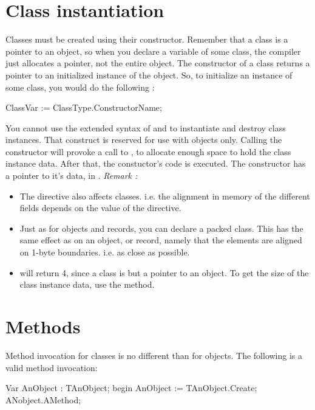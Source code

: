 \documentclass{report}
\begin{document}
\section{Class instantiation}
Classes must be created using their constructor. Remember that a class is a
pointer to an object, so when you declare a variable of some class, the
compiler just allocates a pointer, not the entire object. The constructor of
a class returns a pointer to an initialized instance of the object.
So, to initialize an instance of some class, you would do the following :
\begin{listing}
  ClassVar := ClassType.ConstructorName;
\end{listing}
You cannot use the extended syntax of  and  to
instantiate and destroy class instances. 
That construct is reserved for use with objects only.
Calling the constructor will provoke a call to , to allocate
enough space to hold the class instance data. 
After that, the constuctor's code is executed. 
The constructor has a pointer to it's data, in .
{\em Remark :}
\begin{itemize}
\item The  directive also affects classes.
i.e. the alignment in memory of the different fields depends on the
value of  the  directive.
\item Just as for objects and records, you can declare a packed class.
This has the same effect as on an object, or record, namely that the
elements are aligned on 1-byte boundaries. i.e. as close as possible.
\item {} will return 4, since a class is but a pointer to
an object. To get the size of the class instance data, use the 
 method.
\end{itemize}
\section{Methods}
Method invocation for classes is no different than for objects. The
following is a valid method invocation:
\begin{listing}
Var  AnObject : TAnObject;
begin
  AnObject := TAnObject.Create;
  ANobject.AMethod;
\end{listing}
\end{document}
